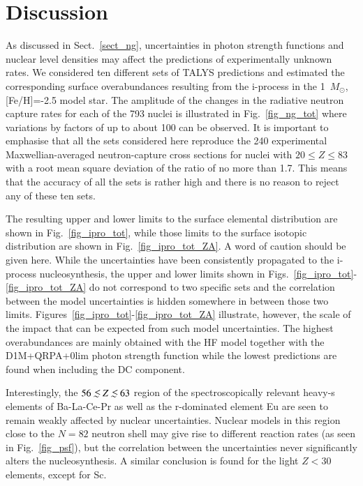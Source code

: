 \documentclass{aa}
\def\la{\,\,\raise0.14em\hbox{$<$}\kern-0.76em\lower0.28em\hbox{$\sim$}\,\,}
\def\Msun{$M_{\odot}$}
\begin{document}

\section{Discussion}
\label{sect_disc}

As discussed in Sect.~\ref{sect_ng}, uncertainties in photon strength functions and nuclear level densities may affect the predictions of experimentally unknown rates. We considered ten different sets of {\sf TALYS} predictions and estimated the corresponding surface overabundances resulting from the i-process in the 1~\Msun{}, [Fe/H]=-2.5 model star. The amplitude of the changes in the radiative neutron capture rates for each of the 793 nuclei is illustrated in Fig.~\ref{fig_ng_tot} where variations by factors of up to about 100 can be observed. It is important to emphasise that all the sets considered here reproduce the 240 experimental Maxwellian-averaged neutron-capture cross sections \citep{Dillman06} for nuclei with $20 \le Z \le 83$ with a root mean square deviation of the ratio of no more than 1.7.  This means that the accuracy of all the sets is rather high and there is no reason to reject any of these ten sets.

The resulting upper and lower limits to the surface  elemental distribution are  shown in Fig.~\ref{fig_ipro_tot}, while those limits to the surface  isotopic distribution are shown in Fig.~\ref{fig_ipro_tot_ZA}. A word of caution should be given here. While the uncertainties have been consistently propagated to the i-process nucleosynthesis, the upper and lower limits shown in Figs.~\ref{fig_ipro_tot}-\ref{fig_ipro_tot_ZA} do not correspond to two specific sets and the correlation between the model uncertainties is hidden somewhere in between those two limits. Figures~\ref{fig_ipro_tot}-\ref{fig_ipro_tot_ZA} illustrate, however, the scale of the impact that can be expected from such model uncertainties. The highest overabundances are mainly obtained with the HF model together with the D1M+QRPA+0lim photon strength function while the lowest predictions are found when including the DC component.

Interestingly, the $56 \la Z \la 63$ region of the spectroscopically relevant heavy-s elements of Ba-La-Ce-Pr  as well as the r-dominated element Eu are seen to remain weakly affected by nuclear uncertainties. Nuclear models in this region close to the $N=82$ neutron shell may give rise to different reaction rates (as seen in Fig.~\ref{fig_psf}), but the correlation between the uncertainties never significantly alters  the nucleosynthesis. A similar conclusion is found for the light $Z<30$ elements, except for Sc.
\end{document}
